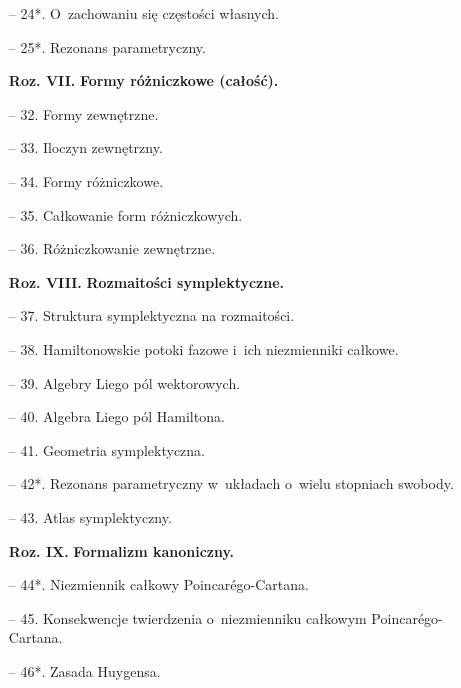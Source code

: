 \documentclass[a4paper,11pt]{article}
\begin{document}
\begin{itemize}
\item[--] 24*. O~zachowaniu się częstości własnych.

\item[--] 25*. Rezonans parametryczny.


\item[\textbf{Roz. VII.}] \textbf{Formy różniczkowe (całość).}

\item[--] 32. Formy zewnętrzne.

\item[--] 33. Iloczyn zewnętrzny.

\item[--] 34. Formy różniczkowe.

\item[--] 35. Całkowanie form różniczkowych.

\item[--] 36. Różniczkowanie zewnętrzne.


\item[\textbf{Roz. VIII.}] \textbf{Rozmaitości symplektyczne.}

\item[--] 37. Struktura symplektyczna na rozmaitości.

\item[--] 38. Hamiltonowskie potoki fazowe i~ich niezmienniki całkowe.

\item[--] 39. Algebry Liego pól wektorowych.

\item[--] 40. Algebra Liego pól Hamiltona.

\item[--] 41. Geometria symplektyczna.

\item[--] 42*. Rezonans parametryczny w~układach o~wielu stopniach
  swobody.

\item[--] 43. Atlas symplektyczny.


\item[\textbf{Roz. IX.}] \textbf{Formalizm kanoniczny.}

\item[--] 44*. Niezmiennik całkowy Poincar\'{e}go-Cartana.

\item[--] 45. Konsekwencje twierdzenia o~niezmienniku całkowym
  Poincar\'{e}go-Cartana.

\item[--] 46*. Zasada Huygensa.


\end{itemize}
\end{document}
